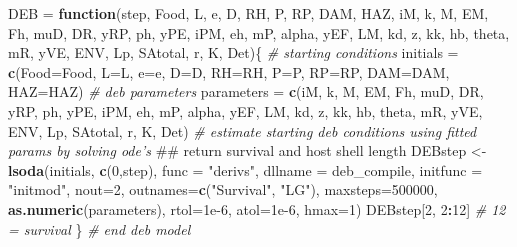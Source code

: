\documentclass[10,portrait]{article}
\newenvironment{Shaded}{\begin{snugshade}}{\end{snugshade}}
\newcommand{\KeywordTok}[1]{\textcolor[rgb]{0.13,0.29,0.53}{\textbf{#1}}}
\newcommand{\DataTypeTok}[1]{\textcolor[rgb]{0.13,0.29,0.53}{#1}}
\newcommand{\DecValTok}[1]{\textcolor[rgb]{0.00,0.00,0.81}{#1}}
\newcommand{\FloatTok}[1]{\textcolor[rgb]{0.00,0.00,0.81}{#1}}
\newcommand{\StringTok}[1]{\textcolor[rgb]{0.31,0.60,0.02}{#1}}
\newcommand{\CommentTok}[1]{\textcolor[rgb]{0.56,0.35,0.01}{\textit{#1}}}
\newcommand{\ControlFlowTok}[1]{\textcolor[rgb]{0.13,0.29,0.53}{\textbf{#1}}}
\newcommand{\OperatorTok}[1]{\textcolor[rgb]{0.81,0.36,0.00}{\textbf{#1}}}
\newcommand{\NormalTok}[1]{#1}
\begin{document}
\begin{Shaded}
\begin{Highlighting}[]
{{\NormalTok{DEB =}\StringTok{ }\ControlFlowTok{function}\NormalTok{(step, Food, L, e, D, RH, P, RP, DAM, HAZ, iM, k, M, EM, }
\NormalTok{               Fh, muD, DR, yRP, ph, yPE, iPM, eh, mP, alpha, yEF,}
\NormalTok{               LM, kd, z, kk, hb, theta, mR, yVE, ENV, Lp, SAtotal, r, K, Det)\{}
  \CommentTok{# starting conditions }
\NormalTok{  initials =}\StringTok{ }\KeywordTok{c}\NormalTok{(}\DataTypeTok{Food=}\NormalTok{Food, }\DataTypeTok{L=}\NormalTok{L, }\DataTypeTok{e=}\NormalTok{e, }\DataTypeTok{D=}\NormalTok{D, }\DataTypeTok{RH=}\NormalTok{RH, }\DataTypeTok{P=}\NormalTok{P, }\DataTypeTok{RP=}\NormalTok{RP, }\DataTypeTok{DAM=}\NormalTok{DAM, }\DataTypeTok{HAZ=}\NormalTok{HAZ)}
  \CommentTok{# deb parameters}
\NormalTok{  parameters =}\StringTok{ }\KeywordTok{c}\NormalTok{(iM, k, M, EM, Fh, muD, DR, yRP, ph, yPE, iPM,}
\NormalTok{                 eh, mP, alpha, yEF, LM, kd, z, kk, hb, theta, mR, yVE, ENV, Lp, SAtotal, r, K, Det)}
  \CommentTok{# estimate starting deb conditions using fitted params by solving ode's}
\NormalTok{  ## return survival and host shell length  }
\NormalTok{  DEBstep <-}\StringTok{ }\KeywordTok{lsoda}\NormalTok{(initials, }\KeywordTok{c}\NormalTok{(}\DecValTok{0}\NormalTok{,step), }\DataTypeTok{func =} \StringTok{"derivs"}\NormalTok{, }\DataTypeTok{dllname =}\NormalTok{ deb_compile, }
                   \DataTypeTok{initfunc =} \StringTok{"initmod"}\NormalTok{,  }\DataTypeTok{nout=}\DecValTok{2}\NormalTok{, }\DataTypeTok{outnames=}\KeywordTok{c}\NormalTok{(}\StringTok{"Survival"}\NormalTok{, }\StringTok{"LG"}\NormalTok{), }\DataTypeTok{maxsteps=}\DecValTok{500000}\NormalTok{,}
                   \KeywordTok{as.numeric}\NormalTok{(parameters),  }\DataTypeTok{rtol=}\FloatTok{1e-6}\NormalTok{, }\DataTypeTok{atol=}\FloatTok{1e-6}\NormalTok{, }\DataTypeTok{hmax=}\DecValTok{1}\NormalTok{)}
\NormalTok{  DEBstep[}\DecValTok{2}\NormalTok{, }\DecValTok{2}\OperatorTok{:}\DecValTok{12}\NormalTok{] }\CommentTok{# 12 = survival}
\NormalTok{\} }\CommentTok{# end deb model}

}}
\end{Highlighting}
\end{Shaded}
\end{document}
